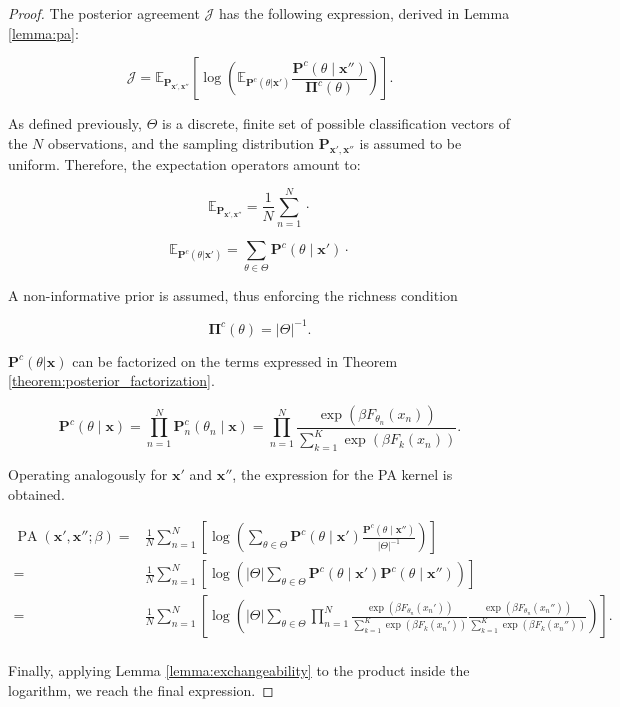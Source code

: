 \begin{proof}
    The posterior agreement $\mathcal{J}$ has the following expression, derived in Lemma \ref{lemma:pa}:

    $$
    \mathcal{J} =\mathbb{E}_{\mathbf{P}_{\bm{x}', \bm{x}''}}\left[\log\left(\mathbb{E}_{\mathbf{P}^c(\theta|\bm{x}')}\frac{\mathbf{P}^c(\theta\mid \bm{x}'')}{\mathbf{\Pi}^c(\theta)}\right)\right].
    $$

    As defined previously, $\Theta$ is a discrete, finite set of possible classification 
    vectors of the $N$ observations, and the sampling distribution $\mathbf{P}_{\bm{x}', \bm{x}''}$ is 
    assumed to be uniform. Therefore, the expectation operators amount to:

    $$
    \mathbb{E}_{\mathbf{P}_{\bm{x}', \bm{x}''}} = \frac{1}{N} \sum_{n=1}^N \cdot
    $$

    $$
    \mathbb{E}_{\mathbf{P}^c(\theta|\bm{x}')} = \sum_{\theta \in \Theta} \mathbf{P}^c(\theta \mid \bm{x}') \cdot
    $$

    A non-informative prior is assumed, thus enforcing the richness condition

    $$
    \mathbf{\Pi}^c(\theta) = |\Theta|^{-1}.
    $$

    $\mathbf{P}^c(\theta|\bm{x})$ can be factorized on the terms expressed in Theorem \ref{theorem:posterior_factorization}.

    $$
    \mathbf{P}^c(\theta \mid \bm{x}) = \prod_{n=1}^N  \mathbf{P}_n^c(\theta_n \mid \bm{x}) = \prod_{n=1}^N \frac{\exp\left(\beta F_{\theta_n}(x_n)\right)}{\sum_{k=1}^K\exp\left(\beta F_k(x_n)\right)}.
    $$

    Operating analogously for $\bm{x}'$ and $\bm{x}''$, the expression for the PA kernel is obtained.

    $$
    \begin{aligned}
    \operatorname{PA}\left(\bm{x}', \bm{x}'' ; \beta\right) = & \frac{1}{N} \sum_{n=1}^N \left[\log\left(\sum_{\theta \in \Theta} \mathbf{P}^c(\theta \mid \bm{x}') \frac{\mathbf{P}^c(\theta\mid \bm{x}'')}{|\Theta|^{-1}}\right)\right] \\
    = & \frac{1}{N} \sum_{n=1}^N \left[\log\left( |\Theta| \sum_{\theta \in \Theta} \mathbf{P}^c(\theta \mid \bm{x}') \mathbf{P}^c(\theta\mid \bm{x}'')\right)\right] \\
    = & \frac{1}{N} \sum_{n=1}^N \left[\log \left( |\Theta| \sum_{\theta \in \Theta} \prod_{n=1}^N \frac{\exp\left(\beta F_{\theta_n}(x_n')\right)}{\sum_{k=1}^K\exp\left(\beta F_k(x_n')\right)} \frac{\exp\left(\beta F_{\theta_n}(x_n'')\right)}{\sum_{k=1}^K\exp\left(\beta F_k(x_n'')\right)} \right)\right]. \\
    \end{aligned}
    $$

    Finally, applying Lemma \ref{lemma:exchangeability} to the product inside the 
    logarithm, we reach the final expression.

\end{proof}

